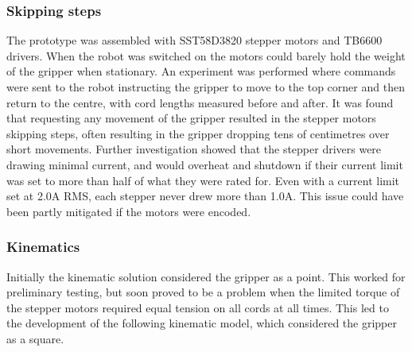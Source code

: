 \documentclass[conference]{IEEEtran}
\begin{document}
\subsubsection{Skipping steps}\label{motor_issues}
The prototype was assembled with SST58D3820 stepper motors and TB6600 drivers. When the robot was switched on the motors could barely hold the weight of the gripper when stationary. An experiment was performed where commands were sent to the robot instructing the gripper to move to the top corner and then return to the centre, with cord lengths measured before and after. It was found that requesting any movement of the gripper resulted in the stepper motors skipping steps, often resulting in the gripper dropping tens of centimetres over short movements. Further investigation showed that the stepper drivers were drawing minimal current, and would overheat and shutdown if their current limit was set to more than half of what they were rated for. Even with a current limit set at 2.0A RMS, each stepper never drew more than 1.0A. This issue could have been partly mitigated if the motors were encoded.
\subsubsection{Kinematics} \label{kinematic_solution_3}
Initially the kinematic solution considered the gripper as a point. This worked for preliminary testing, but soon proved to be a problem when the limited torque of the stepper motors required equal tension on all cords at all times. This led to the development of the following kinematic model, which considered the gripper as a square. 
\end{document}
